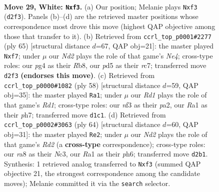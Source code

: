 \documentclass[11pt]{article}
\begin{document}
\clearpage

\begin{figure}[p]\centering
\begin{subfigure}{0.46\textwidth}\centering
\resizebox{\linewidth}{!}{%
\newchessgame
\chessboard[
  setfen={r5k1/8/8/3p4/p5p1/P4n1r/3N2KP/R2R4 w - - 0 29},
  showmover=false,
  pgfstyle=straightmove, color=movearrow, markmove={d2-f3}
]}
\caption{}
\end{subfigure}\hfill
\begin{subfigure}{0.46\textwidth}\centering
\resizebox{\linewidth}{!}{%
\newchessgame
\chessboard[
  setfen={rr6/p1R2Bk1/8/4n1p1/8/P5p1/1P4P1/3K1R2 b - - 2 33},
  showmover=false,
  pgfstyle=straightmove, color=movearrow, markmove={e5-f7}
]}
\caption{}
\end{subfigure}
\\[4pt]
\begin{subfigure}{0.46\textwidth}\centering
\resizebox{\linewidth}{!}{%
\newchessgame
\chessboard[
  setfen={6k1/6pp/4p2P/1p1n4/rP6/1K6/p5P1/3R3R w - - 3 30},
  showmover=false,
  pgfstyle=straightmove, color=movearrow, markmove={d1-a1}
]}
\caption{}
\end{subfigure}\hfill
\begin{subfigure}{0.46\textwidth}\centering
\resizebox{\linewidth}{!}{%
\newchessgame
\chessboard[
  setfen={4rr1k/6p1/7p/4P3/8/1pN2nP1/1P1R2KP/3R4 w - - 0 33},
  showmover=false,
  pgfstyle=straightmove, color=movearrow, markmove={d2-e2}
]}
\caption{}
\end{subfigure}
\caption{\textbf{Move 29, White: \texttt{Nxf3}.} (a) Our position; Melanie plays \texttt{Nxf3} (\texttt{d2f3}). Panels (b)--(d) are the retrieved master positions whose correspondence most drove this move (highest QAP objective among those that transfer to it). (b) Retrieved from \texttt{ccrl\_top\_p0001\#2277} (ply 65) [structural distance $d$=67, QAP obj=21]: the master played \texttt{Nxf7}; under $\mu$ our \emph{Nd2} plays the role of that game's \emph{Ne4}; cross-type roles: our \emph{p}g4 as their \emph{R}b8, our \emph{p}d5 as their \emph{r}c7; transferred move \texttt{d2f3} \textbf{(endorses this move)}. (c) Retrieved from \texttt{ccrl\_top\_p0000\#1082} (ply 58) [structural distance $d$=59, QAP obj=35]: the master played \texttt{Ra1}; under $\mu$ our \emph{Rd1} plays the role of that game's \emph{Rd1}; cross-type roles: our \emph{n}f3 as their \emph{p}a2, our \emph{R}a1 as their \emph{p}h7; transferred move \texttt{d1c1}. (d) Retrieved from \texttt{ccrl\_top\_p0002\#3063} (ply 64) [structural distance $d$=60, QAP obj=31]: the master played \texttt{Re2}; under $\mu$ our \emph{Nd2} plays the role of that game's \emph{Rd2} (a \textbf{cross-type} correspondence); cross-type roles: our \emph{r}a8 as their \emph{N}c3, our \emph{R}a1 as their \emph{p}h6; transferred move \texttt{d2b1}. Synthesis: 1 retrieved analog transferred to \texttt{Nxf3} (summed QAP objective 21, the strongest correspondence among the candidate moves); Melanie committed it via the \texttt{search} selector.}
\label{fig:thought-m56}
\end{figure}
\end{document}
